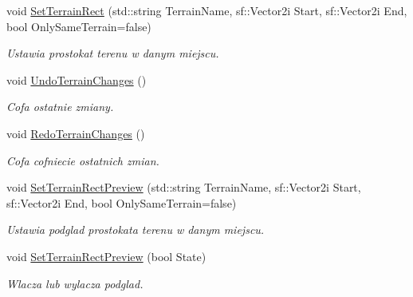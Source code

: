 \begin{DoxyCompactItemize}
\mbox{\label{classtfp_1_1_map_ad35c570a532f25705d12ab6f260bfbe4}} 
void \mbox{\hyperlink{classtfp_1_1_map_ad35c570a532f25705d12ab6f260bfbe4}{Set\+Terrain\+Rect}} (std\+::string Terrain\+Name, sf\+::\+Vector2i Start, sf\+::\+Vector2i End, bool Only\+Same\+Terrain=false)
\begin{DoxyCompactList}\small\item\em Ustawia prostokat terenu w danym miejscu. \end{DoxyCompactList}\item 
\mbox{\label{classtfp_1_1_map_af8d46a3a90c946037f9dae5041f9ca74}} 
void \mbox{\hyperlink{classtfp_1_1_map_af8d46a3a90c946037f9dae5041f9ca74}{Undo\+Terrain\+Changes}} ()
\begin{DoxyCompactList}\small\item\em Cofa ostatnie zmiany. \end{DoxyCompactList}\item 
\mbox{\label{classtfp_1_1_map_a89a0512592eab40c392276ca17b93598}} 
void \mbox{\hyperlink{classtfp_1_1_map_a89a0512592eab40c392276ca17b93598}{Redo\+Terrain\+Changes}} ()
\begin{DoxyCompactList}\small\item\em Cofa cofniecie ostatnich zmian. \end{DoxyCompactList}\item 
\mbox{\label{classtfp_1_1_map_a573230d89656163dd763fdb72d3b5074}} 
void \mbox{\hyperlink{classtfp_1_1_map_a573230d89656163dd763fdb72d3b5074}{Set\+Terrain\+Rect\+Preview}} (std\+::string Terrain\+Name, sf\+::\+Vector2i Start, sf\+::\+Vector2i End, bool Only\+Same\+Terrain=false)
\begin{DoxyCompactList}\small\item\em Ustawia podglad prostokata terenu w danym miejscu. \end{DoxyCompactList}\item 
\mbox{\label{classtfp_1_1_map_a4c14d8a8ae6ef687565255e663699bab}} 
void \mbox{\hyperlink{classtfp_1_1_map_a4c14d8a8ae6ef687565255e663699bab}{Set\+Terrain\+Rect\+Preview}} (bool State)
\begin{DoxyCompactList}\small\item\em Wlacza lub wylacza podglad. \end{DoxyCompactList}\item 

\end{DoxyCompactItemize}
